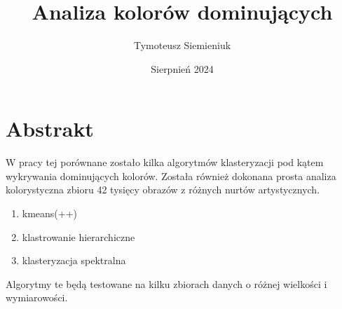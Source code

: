 \documentclass{article}
\title{Analiza kolorów dominujących}
\author{Tymoteusz Siemieniuk}
\date{Sierpnień 2024}
\begin{document}
\maketitle

\section{Abstrakt}

W pracy tej porównane zostało kilka algorytmów klasteryzacji pod kątem wykrywania dominujących kolorów. Została również dokonana prosta analiza kolorystyczna zbioru 42 tysięcy obrazów z różnych nurtów artystycznych. 

\begin{enumerate}
    \item kmeans(++)
    \item klastrowanie hierarchiczne
    \item klasteryzacja spektralna
\end{enumerate}

Algorytmy te będą testowane na kilku zbiorach danych o różnej wielkości i wymiarowości.




\end{document}
